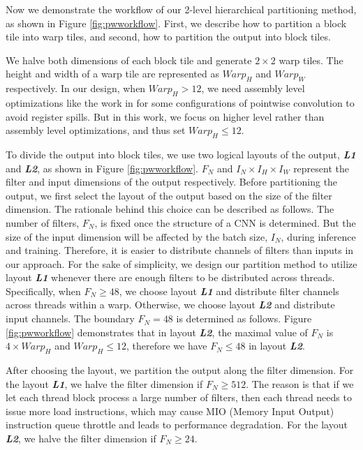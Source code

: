 Now we demonstrate the workflow of our 2-level hierarchical partitioning method, as shown in Figure \ref{fig:pwworkflow}.
First, we describe how to partition a block tile into warp tiles, and second, how to partition the output into block tiles.

We halve both dimensions of each block tile and generate $2 \times 2$ warp tiles. 
The height and width of a warp tile are represented as $Warp_H$ and $Warp_W$ respectively.
In our design, when $Warp_H > 12$, we need assembly level optimizations like the work in \cite{yan2020optimizing,yan2020demystifying} for some configurations of pointwise convolution to avoid register spills.
But in this work, we focus on higher level rather than assembly level optimizations, and thus set $Warp_H \leq 12$.

To divide the output into block tiles, we use two logical layouts of the output, \textbf{\emph{L1}} and \textbf{\emph{L2}}, as shown in Figure \ref{fig:pwworkflow}. 
$F_N$ and $I_N \times I_H \times I_W$ represent the filter and input dimensions of the output respectively.
Before partitioning the output, we first select the layout of the output based on the size of the filter dimension.
The rationale behind this choice can be described as follows. 
The number of filters, $F_N$, is fixed once the structure of a CNN is determined. 
But the size of the input dimension will be affected by the batch size, $I_N$, during inference and training.
Therefore, it is easier to distribute channels of filters than inputs in our approach.
For the sake of simplicity, we design our partition method to utilize layout \textbf{\emph{L1}} whenever there are enough filters to be distributed across threads.
Specifically, when $F_N \ge 48$, we choose layout \textbf{\emph{L1}} and distribute filter channels across threads within a warp. 
Otherwise, we choose layout \textbf{\emph{L2}} and distribute input channels.
The boundary $F_N = 48$ is determined as follows.
Figure \ref{fig:pwworkflow} demonstrates that in layout \textbf{\emph{L2}}, the maximal value of $F_N$ is $4 \times Warp_H$ and $Warp_H \leq 12$, therefore we have $F_N \leq 48$ in layout \textbf{\emph{L2}}.

After choosing the layout, we partition the output along the filter dimension.
For the layout \textbf{\emph{L1}}, we halve the filter dimension if $F_N \geq 512$. 
The reason is that if we let each thread block process a large number of filters, then each thread needs to issue more load instructions, which may cause MIO (Memory Input Output) instruction queue throttle and leads to performance degradation.  
For the layout \textbf{\emph{L2}}, we halve the filter dimension if $F_N \geq 24$.

